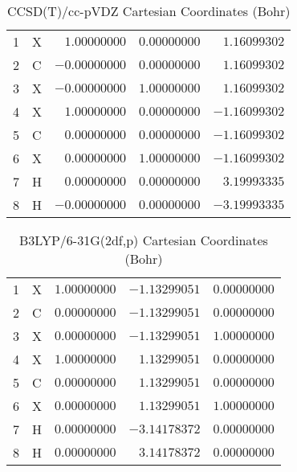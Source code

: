 \documentclass[10pt,oneside]{article}
\begin{document}
\begin{table}[h!]
\centering
\caption{CCSD(T)/cc-pVDZ Cartesian Coordinates (Bohr)}
\begin{tabular}{llrrr}
1  & X  & $ 1.00000000$ & $ 0.00000000$ & $ 1.16099302$ \\
2  & C  & $-0.00000000$ & $ 0.00000000$ & $ 1.16099302$ \\
3  & X  & $-0.00000000$ & $ 1.00000000$ & $ 1.16099302$ \\
4  & X  & $ 1.00000000$ & $ 0.00000000$ & $-1.16099302$ \\
5  & C  & $ 0.00000000$ & $ 0.00000000$ & $-1.16099302$ \\
6  & X  & $ 0.00000000$ & $ 1.00000000$ & $-1.16099302$ \\
7  & H  & $ 0.00000000$ & $ 0.00000000$ & $ 3.19993335$ \\
8  & H  & $-0.00000000$ & $ 0.00000000$ & $-3.19993335$ \\
\end{tabular}
\end{table}

\begin{table}[h!]
\centering
\caption{B3LYP/6-31G(2df,p) Cartesian Coordinates (Bohr)}
\begin{tabular}{llrrr}
1  & X  & $ 1.00000000$ & $-1.13299051$ & $ 0.00000000$ \\
2  & C  & $ 0.00000000$ & $-1.13299051$ & $ 0.00000000$ \\
3  & X  & $ 0.00000000$ & $-1.13299051$ & $ 1.00000000$ \\
4  & X  & $ 1.00000000$ & $ 1.13299051$ & $ 0.00000000$ \\
5  & C  & $ 0.00000000$ & $ 1.13299051$ & $ 0.00000000$ \\
6  & X  & $ 0.00000000$ & $ 1.13299051$ & $ 1.00000000$ \\
7  & H  & $ 0.00000000$ & $-3.14178372$ & $ 0.00000000$ \\
8  & H  & $ 0.00000000$ & $ 3.14178372$ & $ 0.00000000$ \\
\end{tabular}
\end{table}

\clearpage
\end{document}
